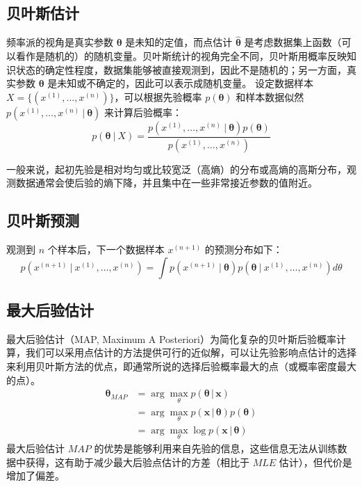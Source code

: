 \documentclass[cn,11pt,chinese,blue,bibstyle=ieeetr]{elegantbook}
\begin{document}
{\subsection{贝叶斯估计}

频率派的视角是真实参数 $\bm{\theta}$ 是未知的定值，而点估计 $\bm{\widehat{\theta}}$ 是考虑数据集上函数（可以看作是随机的）的随机变量。贝叶斯统计的视角完全不同，贝叶斯用概率反映知识状态的确定性程度，数据集能够被直接观测到，因此不是随机的；另一方面，真实参数 $\bm{\theta}$ 是未知或不确定的，因此可以表示成随机变量。
设定数据样本 $X = \{ (x^{(1)}, \dots, x^{(n)}) \}$，可以根据先验概率 $p(\bm{\theta})$ 和样本数据似然 $p(x^{(1)}, \dots , x^{(n)} \ | \ {\bm \theta})$ 来计算后验概率：
\begin{equation}
p({\bm \theta} \ | \ X) = \frac{p(x^{(1)}, \dots , x^{(n)} \ | \ {\bm \theta})p({\bm \theta})}{p(x^{(1)}, \dots , x^{(n)})}
\end{equation}

一般来说，起初先验是相对均匀或比较宽泛（高熵）的分布或高熵的高斯分布，观测数据通常会使后验的熵下降，并且集中在一些非常接近参数的值附近。

\subsection{贝叶斯预测}

观测到 $n$ 个样本后，下一个数据样本 $x^{(n+1)}$ 的预测分布如下：
\begin{equation}
p(x^{(n+1)} \ | \ x^{(1)}, \dots , x^{(n)}) = \int p(x^{(n+1)} \ | \ {\bm \theta})p({\bm \theta} \ | \ x^{(1)}, \dots , x^{(n)})d{\theta}
\end{equation}

\subsection{最大后验估计}

最大后验估计（MAP, Maximum A Posteriori）为简化复杂的贝叶斯后验概率计算，我们可以采用点估计的方法提供可行的近似解，可以让先验影响点估计的选择来利用贝叶斯方法的优点，即通常所说的选择后验概率最大的点（或概率密度最大的点）。
\begin{equation}
\begin{aligned}
\bm{\theta}_{MAP} &= \arg\max_{\theta} p(\bm{\theta} \, | \, \bm{x}) \\
&= \arg\max_{\theta} p(\bm{x} \, | \, \bm{\theta}) p(\bm{\theta}) \\
&= \arg\max_{\theta} \log p(\bm{x} \, | \, \bm{\theta})
\end{aligned}
\end{equation}
最大后验估计 $MAP$ 的优势是能够利用来自先验的信息，这些信息无法从训练数据中获得，这有助于减少最大后验点估计的方差（相比于 $MLE$ 估计），但代价是增加了偏差。



}
\end{document}
